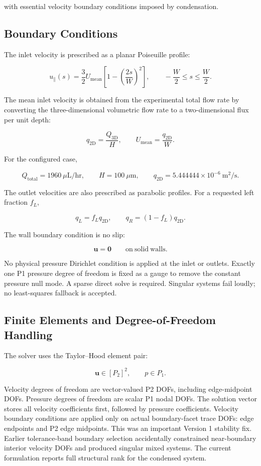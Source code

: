 with essential velocity boundary conditions imposed by condensation.

\subsection{Boundary Conditions}

The inlet velocity is prescribed as a planar Poiseuille profile:

\[
  u_{\parallel}(s)
  =
  \frac{3}{2}U_{\mathrm{mean}}
  \left[
  1 - \left(\frac{2s}{W}\right)^2
  \right],
  \qquad
  -\frac{W}{2}\le s \le \frac{W}{2}.
\]

The mean inlet velocity is obtained from the experimental total flow rate by
converting the three-dimensional volumetric flow rate to a two-dimensional flux
per unit depth:

\[
  q_{\mathrm{2D}} = \frac{Q_{\mathrm{3D}}}{H},
  \qquad
  U_{\mathrm{mean}} = \frac{q_{\mathrm{2D}}}{W}.
\]

For the configured case,

\[
  Q_{\mathrm{total}}=1960~\mu\mathrm{L/hr},
  \qquad
  H=100~\mu\mathrm{m},
  \qquad
  q_{\mathrm{2D}} = 5.444444\times10^{-6}~\mathrm{m^2/s}.
\]

The outlet velocities are also prescribed as parabolic profiles. For a requested
left fraction \(f_L\),

\[
  q_L = f_L q_{\mathrm{2D}},
  \qquad
  q_R = (1-f_L)q_{\mathrm{2D}}.
\]

The wall boundary condition is no slip:

\[
  \mathbf{u}=\mathbf{0}
  \qquad
  \mathrm{on~solid~walls}.
\]

No physical pressure Dirichlet condition is applied at the inlet or outlets.
Exactly one P1 pressure degree of freedom is fixed as a gauge to remove the
constant pressure null mode. A sparse direct solve is required. Singular systems
fail loudly; no least-squares fallback is accepted.

\subsection{Finite Elements and Degree-of-Freedom Handling}

The solver uses the Taylor--Hood element pair:

\[
  \mathbf{u}\in [P_2]^2,
  \qquad
  p\in P_1.
\]

Velocity degrees of freedom are vector-valued P2 DOFs, including edge-midpoint
DOFs. Pressure degrees of freedom are scalar P1 nodal DOFs. The solution vector
stores all velocity coefficients first, followed by pressure coefficients.
Velocity boundary conditions are applied only on actual boundary-facet trace
DOFs: edge endpoints and P2 edge midpoints. This was an important Version 1
stability fix. Earlier tolerance-band boundary selection accidentally
constrained near-boundary interior velocity DOFs and produced singular mixed
systems. The current formulation reports full structural rank for the condensed
system.

